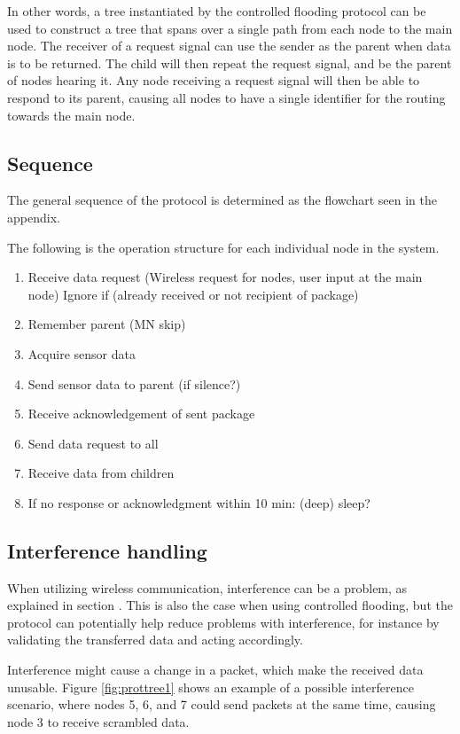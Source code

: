 In other words, a tree instantiated by the controlled flooding protocol can be used to construct a tree that spans over a single path from each node to the main node.
The receiver of a request signal can use the sender as the parent when data is to be returned.
The child will then repeat the request signal, and be the parent of nodes hearing it.
Any node receiving a request signal will then be able to respond to its parent, causing all nodes to have a single identifier for the routing towards the main node.

\subsection{Sequence}
The general sequence of the protocol is determined as the flowchart seen in the appendix.

The following is the operation structure for each individual node in the system.
\begin{enumerate}
	\item Receive data request (Wireless request for nodes, user input at the main node)
	\subitem Ignore if (already received or not recipient of package)
	\item Remember parent (MN skip)
	\item Acquire sensor data
	\item Send sensor data to parent (if silence?)
	\item Receive acknowledgement of sent package
	\item Send data request to all
	\item Receive data from children
	\item If no response or acknowledgment within 10 min: (deep) sleep?
\end{enumerate}

\subsection{Interference handling} \label{cha:crcDesign}
When utilizing wireless communication, interference can be a problem, as explained in section . This is also the case when using controlled flooding, but the protocol can potentially help reduce problems with interference, for instance by validating the transferred data and acting accordingly.

Interference might cause a change in a packet, which make the received data unusable. Figure \ref{fig:prottree1} shows an example of a possible interference scenario, where nodes 5, 6, and 7 could send packets at the same time, causing node 3 to receive scrambled data.

